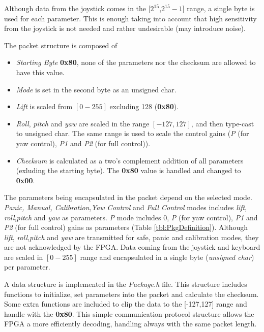 \documentclass{article}
\begin{document}
Although data from the joystick comes in the [$2^{15}$,$2^{15}-1$] range, a single byte is used for each parameter. This is enough taking into account that high sensitivity from the joystick is not needed and rather undesirable (may introduce noise).

The packet structure is composed of
\begin{itemize}

\item{\emph{Starting Byte} \textbf{0x80}, none of the parameters nor the checksum are allowed to have this value.}

\item{\emph{Mode} is set in the second byte as an unsigned char.}

\item{\emph{Lift} is scaled from $[0-255]$ excluding 128 (\textbf{0x80}).}

\item{\emph{Roll}, \emph{pitch} and \emph{yaw} are scaled in the range $[-127,127]$, and then type-cast to unsigned char. The same range is used to scale the control gains (\emph{P} (for yaw control), \emph{P1} and \emph{P2} (for full control)).}

\item{\emph{Checksum} is calculated as a two's complement addition of all parameters (exluding the starting byte). The \textbf{0x80} value is handled and changed to \textbf{0x00}.}

\end{itemize}

The parameters being encapsulated in the packet depend on the selected mode. \emph{Panic, Manual, Calibration,Yaw Control} and \emph{Full Control} modes includes \emph{lift}, \emph{roll},\emph{pitch} and \emph{yaw} as parameters. \emph{P} mode includes 0, \emph{P} (for yaw control), \emph{P1} and \emph{P2} (for full control) gains as parameters (Table \ref{tbl:PkgDefinition}). Although \emph{lift}, \emph{roll},\emph{pitch} and \emph{yaw} are transmitted for safe, panic and calibration modes, they are not acknowledged by the FPGA. Data coming from the joystick and keyboard are scaled in $[0-255]$ range and encapsulated in a single byte (\emph{unsigned char}) per parameter.

A data structure is implemented in the \emph{Package.h} file. This structure includes functions to initialize, set parameters into the packet and calculate the checksum. Some extra functions are included to clip the data to the [-127,127] range and handle with the \textbf{0x80}. This simple communication protocol structure allows the FPGA a more efficiently decoding, handling always with the same packet length.
\end{document}
